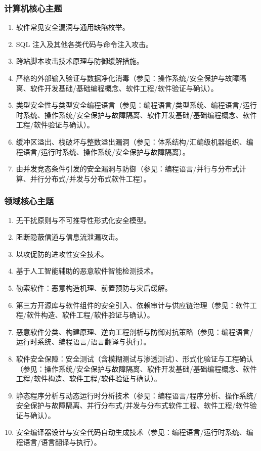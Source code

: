 \subsubsection{计算机核心主题}
\begin{enumerate}\setlength{\itemsep}{0pt}\setlength{\parskip}{0pt}
    \item 软件常见安全漏洞与通用缺陷枚举。
    \item SQL 注入及其他各类代码与命令注入攻击。
    \item 跨站脚本攻击技术原理与防御缓解措施。
    \item 严格的外部输入验证与数据净化消毒（参见：操作系统/安全保护与故障隔离、软件开发基础/基础编程概念、软件工程/软件验证与确认）。
    \item 类型安全性与类型安全编程语言（参见：编程语言/类型系统、编程语言/运行时系统、操作系统/安全保护与故障隔离、软件开发基础/基础编程概念、软件工程/软件验证与确认）。
    \item 缓冲区溢出、栈破坏与整数溢出漏洞（参见：体系结构/汇编级机器组织、编程语言/运行时系统、操作系统/安全保护与故障隔离）。
    \item 由并发竞态条件引发的安全漏洞与防御（参见：编程语言/并行与分布式计算、并行分布式/并发与分布式软件工程）。
\end{enumerate}

\subsubsection{领域核心主题}
\begin{enumerate}\setlength{\itemsep}{0pt}\setlength{\parskip}{0pt}\setcounter{enumi}{7}
    \item 无干扰原则与不可推导性形式化安全模型。
    \item 阻断隐蔽信道与信息流泄漏攻击。
    \item 以攻促防的进攻性安全技术。
    \item 基于人工智能辅助的恶意软件智能检测技术。
    \item 勒索软件：恶意构造机理、前置预防与灾后缓解。
    \item 第三方开源库与软件组件的安全引入、依赖审计与供应链治理（参见：软件工程/软件构造、软件工程/软件验证与确认）。
    \item 恶意软件分类、构建原理、逆向工程剖析与防御对抗策略（参见：编程语言/运行时系统、编程语言/语言翻译与执行）。
    \item 软件安全保障：安全测试（含模糊测试与渗透测试）、形式化验证与工程确认（参见：操作系统/安全保护与故障隔离、软件开发基础/基础编程概念、软件工程/软件构造、软件工程/软件验证与确认）。
    \item 静态程序分析与动态运行时分析技术（参见：编程语言/程序分析、操作系统/安全保护与故障隔离、并行分布式/并发与分布式软件工程、软件工程/软件验证与确认）。
    \item 安全编译器设计与安全代码自动生成技术（参见：编程语言/运行时系统、编程语言/语言翻译与执行）。
\end{enumerate}

